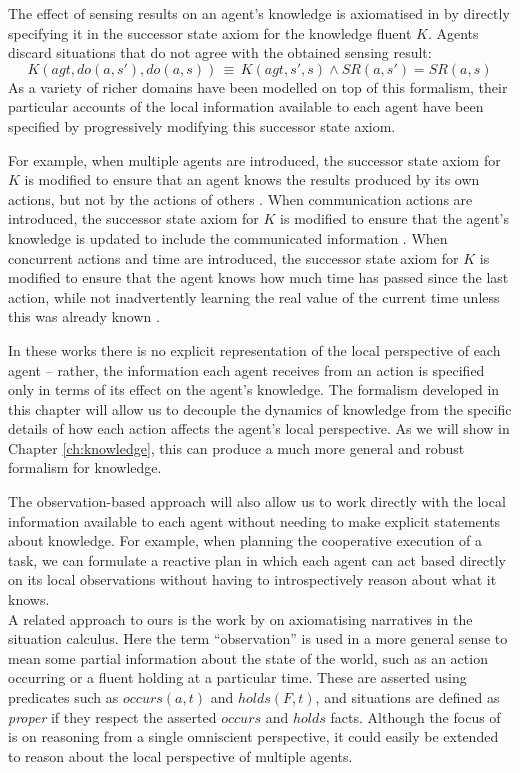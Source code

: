 The effect of sensing results on an agent's knowledge is axiomatised
in \citep{scherl03sc_knowledge} by directly specifying it in the
successor state axiom for the knowledge fluent $K$. Agents discard
situations that do not agree with the obtained sensing result:\[
K(agt,do(a,s'),do(a,s))\,\equiv\, K(agt,s',s)\wedge SR(a,s')=SR(a,s)\]
 As a variety of richer domains have been modelled on top of this
formalism, their particular accounts of the local information available
to each agent have been specified by progressively modifying this
successor state axiom.

For example, when multiple agents are introduced, the successor state
axiom for $K$ is modified to ensure that an agent knows the results
produced by its own actions, but not by the actions of others \citep{shapiro98specifying_ma_systems}.
When communication actions are introduced, the successor state axiom
for $K$ is modified to ensure that the agent's knowledge is updated
to include the communicated information \citep{shapiro01casl_feat_inter,shapiro07sc_goal_change}.
When concurrent actions and time are introduced, the successor state
axiom for $K$ is modified to ensure that the agent knows how much
time has passed since the last action, while not inadvertently learning
the real value of the current time unless this was already known \citep{scherl03conc_knowledge}.

In these works there is no explicit representation of the local perspective
of each agent -- rather, the information each agent receives from
an action is specified only in terms of its effect on the agent's
knowledge. The formalism developed in this chapter will allow us to
decouple the dynamics of knowledge from the specific details of how
each action affects the agent's local perspective. As we will show
in Chapter \ref{ch:knowledge}, this can produce a much more general
and robust formalism for knowledge.

The observation-based approach will also allow us to work directly
with the local information available to each agent without needing
to make explicit statements about knowledge. For example, when planning
the cooperative execution of a task, we can formulate a reactive plan
in which each agent can act based directly on its local observations
without having to introspectively reason about what it knows.\\


A related approach to ours is the work by \citet{pinto98sc_observations}
on axiomatising narratives in the situation calculus. Here the term
{}``observation'' is used in a more general sense to mean some partial
information about the state of the world, such as an action occurring
or a fluent holding at a particular time. These are asserted using
predicates such as $occurs(a,t)$ and $holds(F,t)$, and situations
are defined as \emph{proper} if they respect the asserted $occurs$
and $holds$ facts. Although the focus of \citep{pinto98sc_observations}
is on reasoning from a single omniscient perspective, it could easily
be extended to reason about the local perspective of multiple agents.

